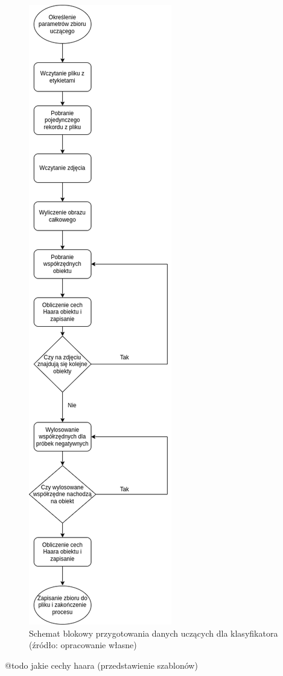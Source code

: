 \begin{figure}[!ht]
    \centering
    \includegraphics[scale=0.4]{Pictures/prepare_haar_dataset}
    \caption{Schemat blokowy przygotowania danych uczących dla klasyfikatora (źródło: opracowanie własne)}
    \label{fig:haar_feats_dataset_prepare}
\end{figure}
\FloatBarrier
@todo
jakie cechy haara (przedstawienie szablonów)

